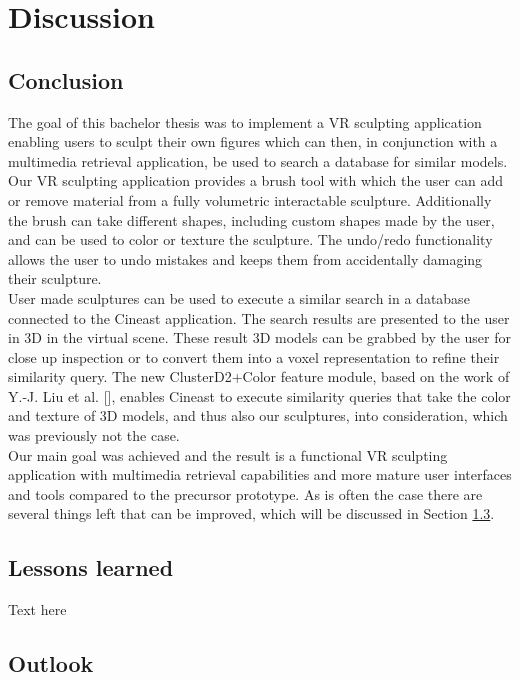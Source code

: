 \chapter{Discussion}

\section{Conclusion}

The goal of this bachelor thesis was to implement a VR sculpting application enabling users to sculpt their own figures which can then, in conjunction with a multimedia retrieval application, be used to search a database for similar models.\\
Our VR sculpting application provides a brush tool with which the user can add or remove material from a fully volumetric interactable sculpture. Additionally the brush can take different shapes, including custom shapes made by the user, and can be used to color or texture the sculpture. The undo/redo functionality allows the user to undo mistakes and keeps them from accidentally damaging their sculpture.\\
User made sculptures can be used to execute a similar search in a database connected to the Cineast application. The search results are presented to the user in 3D in the virtual scene. These result 3D models can be grabbed by the user for close up inspection or to convert them into a voxel representation to refine their similarity query. The new ClusterD2+Color feature module, based on the work of Y.-J. Liu et al. [], enables Cineast to execute similarity queries that take the color and texture of 3D models, and thus also our sculptures, into consideration, which was previously not the case.\\
Our main goal was achieved and the result is a functional VR sculpting application with multimedia retrieval capabilities and more mature user interfaces and tools compared to the precursor prototype. As is often the case there are several things left that can be improved, which will be discussed in Section \ref{sec:future_work}.


\section{Lessons learned}

Text here

\section{Outlook}
\label{sec:future_work}

